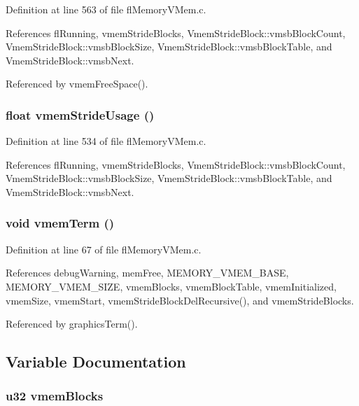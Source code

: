 Definition at line 563 of file fl\-Memory\-VMem.c.

References fl\-Running, vmem\-Stride\-Blocks, Vmem\-Stride\-Block::vmsb\-Block\-Count, Vmem\-Stride\-Block::vmsb\-Block\-Size, Vmem\-Stride\-Block::vmsb\-Block\-Table, and Vmem\-Stride\-Block::vmsb\-Next.

Referenced by vmem\-Free\-Space().
\subsubsection{\setlength{\rightskip}{0pt plus 5cm}float vmem\-Stride\-Usage ()}\label{flMemoryVMem_8h_c1ffa02ebd6cebc73b39aba7dff8a43a}




Definition at line 534 of file fl\-Memory\-VMem.c.

References fl\-Running, vmem\-Stride\-Blocks, Vmem\-Stride\-Block::vmsb\-Block\-Count, Vmem\-Stride\-Block::vmsb\-Block\-Size, Vmem\-Stride\-Block::vmsb\-Block\-Table, and Vmem\-Stride\-Block::vmsb\-Next.
\subsubsection{\setlength{\rightskip}{0pt plus 5cm}void vmem\-Term ()}\label{flMemoryVMem_8h_ae3e2102bd1766ba9ac8ddf6bbc1ccdb}




Definition at line 67 of file fl\-Memory\-VMem.c.

References debug\-Warning, mem\-Free, MEMORY\_\-VMEM\_\-BASE, MEMORY\_\-VMEM\_\-SIZE, vmem\-Blocks, vmem\-Block\-Table, vmem\-Initialized, vmem\-Size, vmem\-Start, vmem\-Stride\-Block\-Del\-Recursive(), and vmem\-Stride\-Blocks.

Referenced by graphics\-Term().

\subsection{Variable Documentation}
\subsubsection{\setlength{\rightskip}{0pt plus 5cm}u32 {\bf vmem\-Blocks}}\label{flMemoryVMem_8h_76eb0f2936c402d05c70a0e710407d6a}




